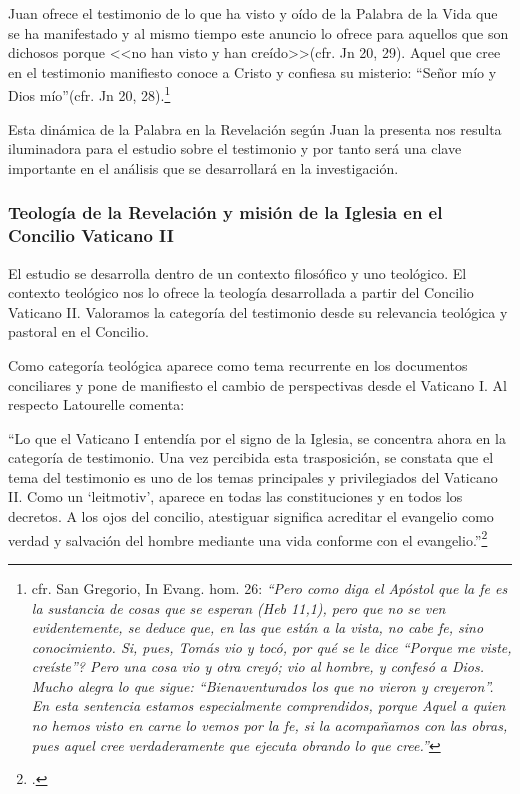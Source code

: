 \documentclass[12pt]{article}
\begin{document}
{Juan ofrece el testimonio de lo que ha visto y oído de la Palabra de la Vida que se ha manifestado y al mismo tiempo este anuncio lo ofrece para aquellos que son dichosos porque <<no han visto y han creído>>(cfr. Jn 20, 29). Aquel que cree en el testimonio manifiesto conoce a Cristo y confiesa su misterio: ``Señor mío y Dios mío''(cfr. Jn 20, 28).\footnote{cfr. San Gregorio, In Evang. hom. 26: \emph{``Pero como diga el Apóstol que la fe es la sustancia de cosas que se esperan (Heb 11,1), pero que no se ven evidentemente, se deduce que, en las que están a la vista, no cabe fe, sino conocimiento. Si, pues, Tomás vio y tocó, \textquestiondown por qué se le dice ``Porque me viste, creíste''? Pero una cosa vio y otra creyó; vio al hombre, y confesó a Dios. Mucho alegra lo que sigue: ``Bienaventurados los que no vieron y creyeron''. En esta sentencia estamos especialmente comprendidos, porque Aquel a quien no hemos visto en carne lo vemos por la fe, si la acompañamos con las obras, pues aquel cree verdaderamente que ejecuta obrando lo que cree.''}
}

Esta dinámica de la Palabra en la Revelación según Juan la presenta nos resulta iluminadora para el estudio sobre el testimonio y por tanto será una clave importante en el análisis que se desarrollará en la investigación.

\subsubsection{Teología de la Revelación y misión de la Iglesia en el Concilio Vaticano II}

El estudio se desarrolla dentro de un contexto filosófico y uno teológico. El contexto teológico nos lo ofrece la teología desarrollada a partir del Concilio Vaticano II. Valoramos la categoría del testimonio desde su relevancia teológica y pastoral en el Concilio. 

Como categoría teológica aparece como tema recurrente en los documentos conciliares y pone de manifiesto el cambio de perspectivas desde el Vaticano I. Al respecto Latourelle comenta:

``Lo que el Vaticano I entendía por el signo de la Iglesia, se concentra ahora en la categoría de testimonio. Una vez percibida esta trasposición, se constata que el tema del testimonio es uno de los temas principales y privilegiados del Vaticano II. Como un `leitmotiv', aparece en todas las constituciones y en todos los decretos. A los ojos del concilio, atestiguar significa acreditar el evangelio como verdad y salvación del hombre mediante una vida conforme con el evangelio.''\footcite[p.~1532]{dicctf}

}
\end{document}
